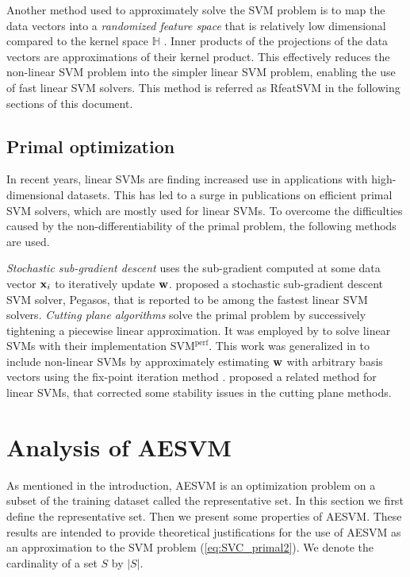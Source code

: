 \documentclass[twoside]{article}
\begin{document}
Another method used to approximately solve the SVM problem is to map the data vectors into a {\em randomized feature space} that is relatively low dimensional compared to the kernel space $\mathbb{H}$ \citep{rahimi07}. Inner products of the projections of the data vectors are approximations of their kernel product. This effectively reduces the non-linear SVM problem into the simpler linear SVM problem, enabling the use of fast linear SVM solvers. This method is referred as RfeatSVM in the following sections of this document.


\subsection{Primal optimization}
In recent years, linear SVMs are finding increased use in applications with high-dimensional datasets. This has led to a surge in publications on efficient primal SVM solvers, which are mostly used for linear SVMs. To overcome the difficulties caused by the non-differentiability of the primal problem, the following methods are used.

{\em Stochastic sub-gradient descent} \citep{Zhang04} uses the sub-gradient computed at some data vector ${\bf x}_i$ to iteratively update ${\bf w}$. \citet{Shwartz11} proposed a stochastic sub-gradient descent SVM solver, Pegasos, that is reported to be among the fastest linear SVM solvers. {\em Cutting plane algorithms} \citep{Kelley60} solve the primal problem by successively tightening a piecewise linear approximation. It was employed by \citet{Joachims06} to solve linear SVMs with their implementation $\text{SVM}^{\text{perf}}$. This work was generalized in \citet{Joachims09} to include non-linear SVMs by approximately estimating $\bf w$ with arbitrary basis vectors using the fix-point iteration method \citep{Scholkopf01}. \citet{Teo10} proposed a related method for linear SVMs, that corrected some stability issues in the cutting plane methods.

\section{Analysis of AESVM}

As mentioned in the introduction, AESVM is an optimization problem on a subset of the training dataset called the representative set. In this section we first define the representative set. Then we present some properties of AESVM. These results are intended to provide theoretical justifications for the use of AESVM as an approximation to the SVM problem (\ref{eq:SVC_primal2}). We denote the cardinality of a set $S$ by $|S|$.
\end{document}
